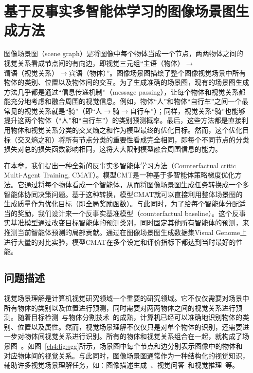 \chapter{基于反事实多智能体学习的图像场景图生成方法}

图像场景图（scene graph）是将图像中每个物体当成一个节点，两两物体之间的视觉关系看成节点间的有向边，即视觉三元组“主语（物体）$\to$谓语（视觉关系）$\to$宾语（物体）”。图像场景图描绘了整个图像视觉场景中所有物体的类别、位置以及物体间的交互。为了生成准确的场景图，现有的场景图生成方法几乎都是通过“信息传递机制”（message passing），让每个物体和视觉关系都能充分地考虑和融合周围的视觉信息。例如，物体“人”和物体“自行车”之间一个最常见的视觉关系就是“骑”（即“人$\to$骑$\to$自行车”）；同样，视觉关系“骑”也能够提升这两个物体（“人”和“自行车”）的类别预测概率。最后，这些方法都是直接利用物体和视觉关系分类的交叉熵之和作为模型最终的优化目标。然而，这个优化目标（交叉熵之和）将所有节点分类的重要性看成完全相同，即每个不同节点的分类损失对总的损失函数影响相同，这将大大限制模型融合周围信息的能力。

在本章，我们提出一种全新的反事实多智能体学习方法（Counterfactual critic Multi-Agent Training, CMAT）。模型CMT是一种基于多智能体策略梯度优化方法。它通过将每个物体看成一个智能体，从而将图像场景图生成任务转换成一个多智能体协同决策问题。基于这种转换，模型CMAT就可以直接利用整体场景图的生成质量作为优化目标（即全局奖励函数）。与此同时，为了给每个智能体分配适当的奖励，我们设计来一个反事实基准模型（counterfactual baseline）。这个反事实基准模型通过改变目标智能体的预测类别，同时固定其他所有智能体的预测，来推测当前智能体预测的局部贡献。通过在图像场景图生成数据集Visual Genome上进行大量的对比实验，模型CMAT在多个设定和评价指标下都达到当时最好的性能。


\section{问题描述}

视觉场景理解是计算机视觉研究领域一个重要的研究领域。它不仅仅需要对场景中所有物体的类别以及位置进行预测，同时需要对两两物体之间的视觉关系进行预测。随着目标检测~\cite{ren2015faster,liu2016ssd}与物体分割技术~\cite{long2015fully,he2017mask}的成熟，计算机已经可以准确地识别物体的类别、位置以及属性。然而，视觉场景理解不仅仅只是对单个物体的识别，还需要进一步对物体间视觉关系进行识别。所有的物体和视觉关系组合在一起，就构成了场景图~\cite{johnson2015image}。如图~\ref{ch4:fig:sgg}所示，场景图中每个节点和边分别表示图像中的物体和对应物体间的视觉关系。与此同时，图像场景图通常作为一种结构化的视觉知识，辅助许多视觉场景理解任务，如：图像描述生成~\cite{yao2018exploring,yang2019auto,kim2019dense}、视觉问答~\cite{norcliffe2018learning,hudson2019gqa}和视觉推理~\cite{shi2019explainable,haurilet2019s}等。

